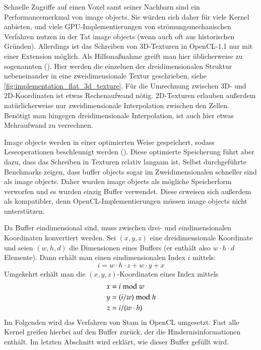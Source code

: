 Schnelle Zugriffe auf einen Voxel samt seiner Nachbarn sind ein
Performancemerkmal von image objects. Sie würden sich daher für viele Kernel
anbieten, und viele GPU-Implementierungen von
strömungsmechanischen Verfahren nutzen in der Tat image objects (wenn auch
oft aus historischen Gründen). Allerdings ist das Schreiben von
3D-Texturen in OpenCL-1.1 nur mit einer Extension möglich. Als
Hilfsmaßnahme greift man hier üblicherweise zu sogenannten
 (\cite{Harris2003}). Hier werden die
einzelnen  der dreidimensionalen Struktur
nebeneinander in eine zweidimensionale Textur geschrieben, siehe
\cref{fig:implementation_flat_3d_texture}. Für die Umrechnung
zwischen 3D- und 2D-Koordinaten ist etwas Rechenaufwand
nötig. 2D-Texturen erlauben außerdem natürlicherweise nur
zweidimensionale Interpolation zwischen den Zellen. Benötigt man
hingegen dreidimensionale Interpolation, ist auch hier etwas
Mehraufwand zu verrechnen.

Image objects werden in einer optimierten Weise gespeichert, sodass
Leseoperationen beschleunigt werden
(\cite{Pharr:2005:GGP:1062395}). Diese optimierte Speicherung führt
aber dazu, dass das Schreiben in Texturen relativ langsam ist. Selbst
durchgeführte Benchmarks zeigen, dass buffer objects sogar im
Zweidimensionalen schneller sind als image objects. Daher wurden image
objects als mögliche Speicherform verworfen und es wurden einzig
Buffer verwendet. Diese erweisen sich außerdem als kompatibler, denn
OpenCL-Implementierungen müssen image objects nicht unterstützen.

Da Buffer eindimensional sind, muss zwischen drei- und
eindimensionalen Koordinaten konvertiert werden. Sei $(x,y,z)$ eine
dreidimensionale Koordinate und seien $(w,h,d)$ die Dimensionen eines
Buffers (er enthält also $w \cdot h \cdot d$ Elemente). Dann erhält
man einen eindimensionalen Index $i$ mittels:
\begin{equation}
\label{eq:implementation_wind_3d_to_2d}
i = w \cdot h \cdot z + w \cdot y + x
\end{equation}
Umgekehrt erhält man die $(x,y,z)$-Koordinaten eines Index mittels
\begin{equation}
\begin{split}
x &= i \bmod w \\
y &= (i / w) \bmod h \\
z &= i / (w \cdot h)  \\
\end{split}
\end{equation}
Im Folgenden wird das Verfahren von Stam in OpenCL umgesetzt. Fast
alle Kernel greifen hierbei auf den Buffer zurück, der die
Hindernisinformationen enthält. Im letzten Abschnitt wird erklärt, wie
dieser Buffer gefüllt wird.


